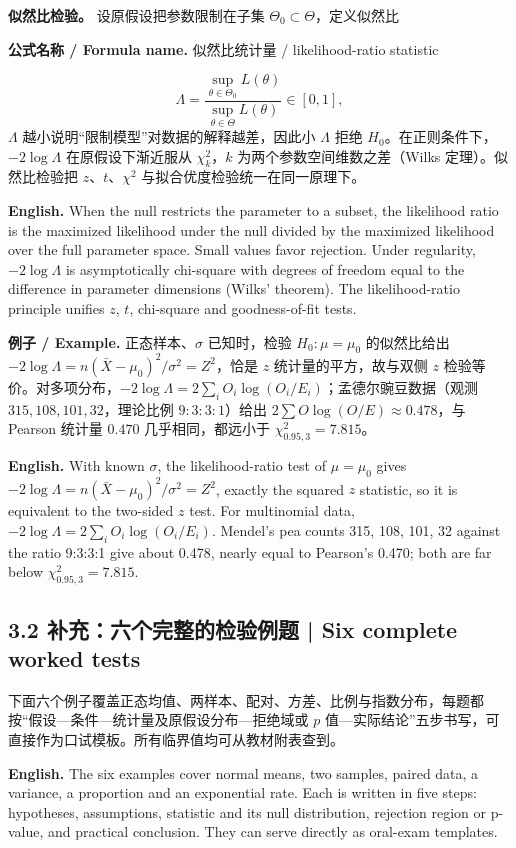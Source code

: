 \documentclass[UTF8,11pt,a4paper]{ctexart}
\newcommand{\EN}[1]{\par\noindent\textbf{English.} #1\par}
\newcommand{\FORMULA}[2]{\par\noindent\textbf{公式名称 / Formula name.} #1 / #2\par}
\newcommand{\EX}[2]{\par\noindent\textbf{例子 / Example.} #1\par\EN{#2}}
\begin{document}
\noindent\textbf{似然比检验。} 设原假设把参数限制在子集 $\Theta_0\subset\Theta$，定义似然比
\FORMULA{似然比统计量}{likelihood-ratio statistic}
\[
\Lambda=\frac{\sup_{\theta\in\Theta_0}L(\theta)}{\sup_{\theta\in\Theta}L(\theta)}
\in[0,1],
\]
$\Lambda$ 越小说明“限制模型”对数据的解释越差，因此小 $\Lambda$ 拒绝 $H_0$。在正则条件下，$-2\log\Lambda$ 在原假设下渐近服从 $\chi^2_k$，$k$ 为两个参数空间维数之差（Wilks 定理）。似然比检验把 $z$、$t$、$\chi^2$ 与拟合优度检验统一在同一原理下。
\EN{When the null restricts the parameter to a subset, the likelihood ratio is the maximized likelihood under the null divided by the maximized likelihood over the full parameter space. Small values favor rejection. Under regularity, $-2\log\Lambda$ is asymptotically chi-square with degrees of freedom equal to the difference in parameter dimensions (Wilks' theorem). The likelihood-ratio principle unifies $z$, $t$, chi-square and goodness-of-fit tests.}

\EX{正态样本、$\sigma$ 已知时，检验 $H_0:\mu=\mu_0$ 的似然比给出 $-2\log\Lambda=n(\bar X-\mu_0)^2/\sigma^2=Z^2$，恰是 $z$ 统计量的平方，故与双侧 $z$ 检验等价。对多项分布，$-2\log\Lambda=2\sum_iO_i\log(O_i/E_i)$；孟德尔豌豆数据（观测 $315,108,101,32$，理论比例 $9:3:3:1$）给出 $2\sum O\log(O/E)\approx0.478$，与 Pearson 统计量 $0.470$ 几乎相同，都远小于 $\chi^2_{0.95,3}=7.815$。}{With known $\sigma$, the likelihood-ratio test of $\mu=\mu_0$ gives $-2\log\Lambda=n(\bar X-\mu_0)^2/\sigma^2=Z^2$, exactly the squared $z$ statistic, so it is equivalent to the two-sided $z$ test. For multinomial data, $-2\log\Lambda=2\sum_iO_i\log(O_i/E_i)$. Mendel's pea counts 315, 108, 101, 32 against the ratio 9:3:3:1 give about 0.478, nearly equal to Pearson's 0.470; both are far below $\chi^2_{0.95,3}=7.815$.}

\subsection*{3.2 补充：六个完整的检验例题 | Six complete worked tests}
\noindent 下面六个例子覆盖正态均值、两样本、配对、方差、比例与指数分布，每题都按“假设—条件—统计量及原假设分布—拒绝域或 $p$ 值—实际结论”五步书写，可直接作为口试模板。所有临界值均可从教材附表查到。
\EN{The six examples cover normal means, two samples, paired data, a variance, a proportion and an exponential rate. Each is written in five steps: hypotheses, assumptions, statistic and its null distribution, rejection region or p-value, and practical conclusion. They can serve directly as oral-exam templates.}
\end{document}
